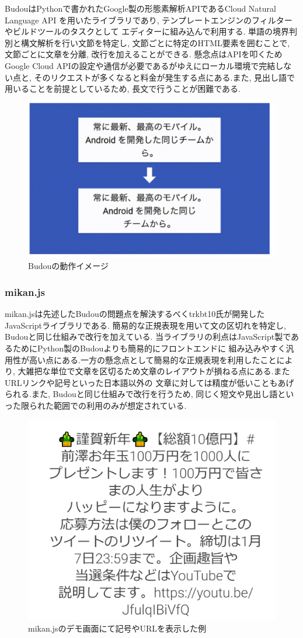 BudouはPythonで書かれたGoogle製の形態素解析APIであるCloud Natural Language API
を用いたライブラリであり, テンプレートエンジンのフィルターやビルドツールのタスクとして
エディターに組み込んで利用する.
単語の境界判別と構文解析を行い文節を特定し, 文節ごとに特定のHTML要素を囲むことで, 
文節ごとに文章を分離, 改行を加えることができる.
懸念点はAPIを叩くためGoogle Cloud APIの設定や通信が必要であるがゆえにローカル環境で完結しない点と, 
そのリクエストが多くなると料金が発生する点にある.また, 見出し語で用いることを前提としているため, 
長文で行うことが困難である.

\begin{figure}[H]
    \centering
    \label{fig:image7}
    \includegraphics[width=0.6\columnwidth]{image/02/img2.png}
    \caption[Budouの動作イメージ] {Budouの動作イメージ\footnotemark[3]}
\end{figure}

\subsubsection{mikan.js}

mikan.jsは先述したBudouの問題点を解決するべくtrkbt10氏が開発したJavaScriptライブラリである.
簡易的な正規表現を用いて文の区切れを特定し, Budouと同じ仕組みで改行を加えている.
当ライブラリの利点はJavaScript製であるためにPython製のBudouよりも簡易的にフロントエンドに
組み込みやすく汎用性が高い点にある.一方の懸念点として簡易的な正規表現を利用したことにより, 
大雑把な単位で文章を区切るため文章のレイアウトが損ねる点にある.またURLリンクや記号といった日本語以外の
文章に対しては精度が低いこともあげられる.また, Budouと同じ仕組みで改行を行うため, 
同じく短文や見出し語といった限られた範囲での利用のみが想定されている.

\begin{figure}[H]
    \centering
    \label{fig:image8}
    \includegraphics[width=0.6\columnwidth]{image/02/img3.png}
    \caption[mikan.jsのデモ画面にて記号やURLを表示した例]{mikan.jsのデモ画面にて記号やURLを表示した例\footnotemark[4]}
\end{figure}

